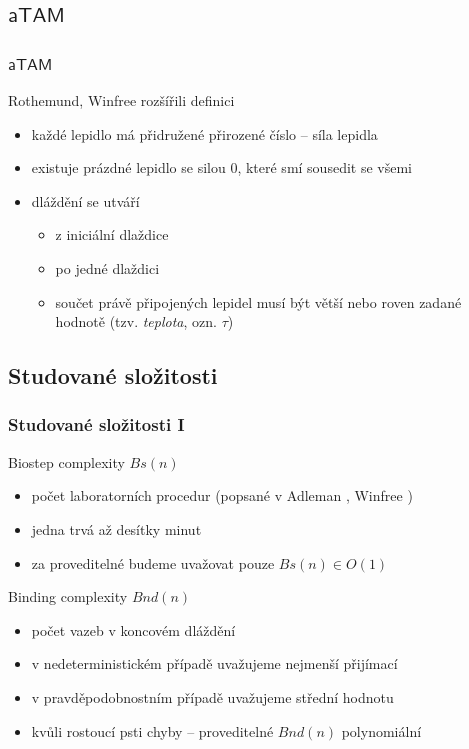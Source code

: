 \documentclass[10pt]{beamer}
\newcommand{\atam}{\mathsf{aTAM}}
\theoremstyle{definition}
\theoremstyle{remark}
\begin{document}
\subsection{$\atam$}
\begin{frame}
\frametitle{$\atam$}
	Rothemund, Winfree rozšířili definici
	\begin{itemize}
		\item každé lepidlo má přidružené přirozené číslo -- síla lepidla
		\item existuje prázdné lepidlo se silou 0, které smí sousedit se všemi
		\item dláždění se utváří
		\begin{itemize}
			\item z iniciální dlaždice
			\item po jedné dlaždici
			\item součet právě připojených lepidel musí být větší nebo roven zadané hodnotě (tzv. {\em teplota}, ozn. $\tau$)
		\end{itemize}
	\end{itemize}
\end{frame}

\subsection{Studované složitosti}
\begin{frame}
\frametitle{Studované složitosti I}
	Biostep complexity $Bs(n)$
	\begin{itemize}
		\item počet laboratorních procedur (popsané v Adleman \cite{adleman95biostep}, Winfree \cite{winfree_phd})
		\item jedna trvá až desítky minut
		\item za proveditelné budeme uvažovat pouze $Bs(n) \in O(1)$
	\end{itemize}
	Binding complexity $Bnd(n)$
	\begin{itemize}
		\item počet vazeb v koncovém dláždění
		\item v nedeterministickém případě uvažujeme nejmenší přijímací
		\item v pravděpodobnostním případě uvažujeme střední hodnotu
		\item kvůli rostoucí psti chyby -- proveditelné $Bnd(n)$ polynomiální
	\end{itemize}
\end{frame}
\end{document}
